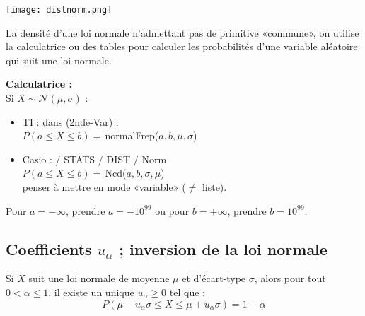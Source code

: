 \documentclass[a4paper,11pt]{article} \usepackage{FBarticle} \mapage{831}{Probabilités 2} %
\begin{document}
\begin{multicols}{2}
\noindent\texttt{[image: distnorm.png]}\par

\par

\rema La densité d'une loi normale n'admettant pas de primitive «commune», on utilise la calculatrice ou des tables pour calculer les probabilités d'une variable aléatoire qui suit une loi normale.\par

\rema \textbf{Calculatrice :}\\
Si $X\sim\mathcal{N}(\mu,\sigma)$ :
\begin{itemize}
\item TI : dans (2nde-Var) : \\
$P(a\leq X\leq b)=\,$normalFrep($a,b,\mu,\sigma$) \\
\item Casio :  / STATS / DIST / Norm \\
$P(a\leq X\leq b)=\,$Ncd($a,b,\sigma,\mu$)\\
penser à mettre en mode «variable» ($\neq$ liste).
\end{itemize}


\rema Pour $a=-\infty$, prendre $a=-10^{99}$ ou pour $b=+\infty$, prendre $b=10^{99}$.

\subsection{Coefficients $u_\alpha$ ; inversion de la loi normale}

\prop Si $X$ suit une loi normale de moyenne $\mu$ et d'écart-type $\sigma$, alors pour tout $0<\alpha\leq1$, il existe un unique $u_\alpha\geq0$ tel que :
$$P(\mu-u_\alpha \sigma \leq X \leq \mu+u_\alpha \sigma)=1-\alpha$$

\demo {}



\end{multicols}
\end{document}
